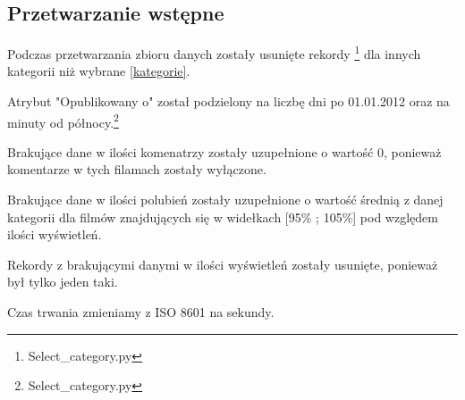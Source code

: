 \subsection{Przetwarzanie wstępne}
\hspace{\parindent}
Podczas przetwarzania zbioru danych zostały
usunięte rekordy \footnote{Select\_category.py}
dla innych kategorii niż wybrane \ref{kategorie}.

Atrybut "Opublikowany o" został podzielony na liczbę dni po 01.01.2012 oraz na minuty od północy.\footnote{Select\_category.py}

Brakujące dane w ilości komenatrzy zostały uzupełnione o wartość 0, ponieważ komentarze w tych filamach zostały wyłączone.

Brakujące dane w ilości polubień zostały uzupełnione o wartość średnią z danej kategorii dla filmów znajdujących się w widełkach [95\% ; 105\%] pod względem ilości wyświetleń.

Rekordy z brakującymi danymi w ilości wyświetleń zostały usunięte, ponieważ był tylko jeden taki.

Czas trwania zmieniamy z ISO 8601 na sekundy.



